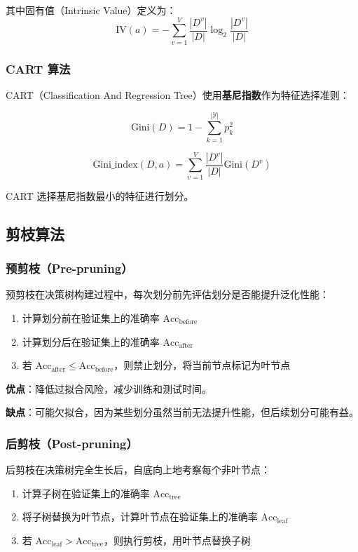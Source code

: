 \documentclass[UTF8]{ctexart}
\begin{document}
\noindent 其中固有值（Intrinsic Value）定义为：
\begin{equation}
\text{IV}(a) = -\sum_{v=1}^{V}\frac{|D^v|}{|D|}\log_2\frac{|D^v|}{|D|}
\end{equation}

\subsubsection{CART 算法}
CART（Classification And Regression Tree）使用\textbf{基尼指数}作为特征选择准则：

\begin{equation}
\text{Gini}(D) = 1 - \sum_{k=1}^{|\mathcal{Y}|}p_k^2
\end{equation}

\begin{equation}
\text{Gini\_index}(D, a) = \sum_{v=1}^{V}\frac{|D^v|}{|D|}\text{Gini}(D^v)
\end{equation}

\noindent CART 选择基尼指数最小的特征进行划分。

\subsection{剪枝算法}

\subsubsection{预剪枝（Pre-pruning）}
预剪枝在决策树构建过程中，每次划分前先评估划分是否能提升泛化性能：
\begin{enumerate}
    \item 计算划分前在验证集上的准确率 $\text{Acc}_{\text{before}}$
    \item 计算划分后在验证集上的准确率 $\text{Acc}_{\text{after}}$
    \item 若 $\text{Acc}_{\text{after}} \leq \text{Acc}_{\text{before}}$，则禁止划分，将当前节点标记为叶节点
\end{enumerate}

\noindent \textbf{优点}：降低过拟合风险，减少训练和测试时间。

\noindent \textbf{缺点}：可能欠拟合，因为某些划分虽然当前无法提升性能，但后续划分可能有益。

\subsubsection{后剪枝（Post-pruning）}
后剪枝在决策树完全生长后，自底向上地考察每个非叶节点：
\begin{enumerate}
    \item 计算子树在验证集上的准确率 $\text{Acc}_{\text{tree}}$
    \item 将子树替换为叶节点，计算叶节点在验证集上的准确率 $\text{Acc}_{\text{leaf}}$
    \item 若 $\text{Acc}_{\text{leaf}} > \text{Acc}_{\text{tree}}$，则执行剪枝，用叶节点替换子树
\end{enumerate}
\end{document}
